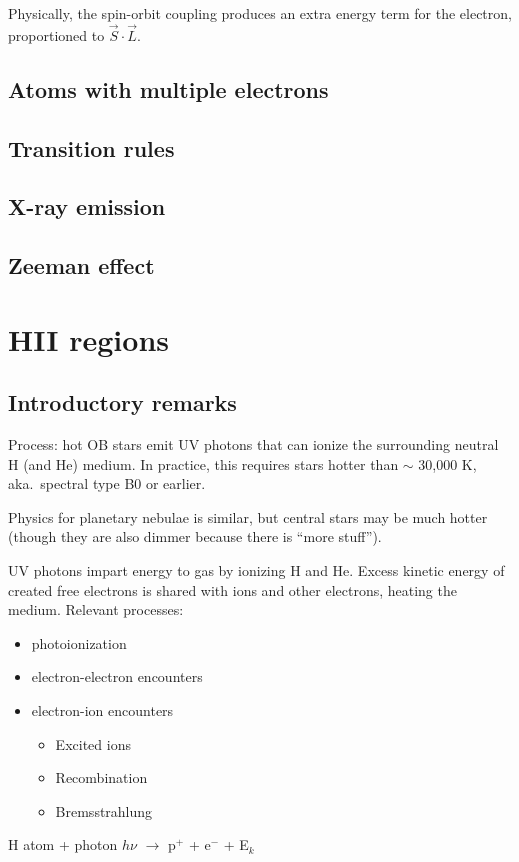 \documentclass[12pt]{article}
\newcommand{\mar}[1]{\hspace{0pt}\marginpar{-\textcolor{black}{#1}-}}
\begin{document}
Physically, the spin-orbit coupling produces an extra energy term for the
electron, proportioned to $\vec{S}\cdot\vec{L}$.

\mar{I10}
\subsection{Atoms with multiple electrons}

\mar{I11}
\mar{I12}
\mar{I13}
\mar{I14}
\mar{I15}
\mar{I16}
\mar{I17}
\mar{I18}
\mar{I19}
\subsection{Transition rules}

\mar{I20}
\subsection{X-ray emission}
\subsection{Zeeman effect}

\mar{I21}

\newpage
\mar{51}
\section{HII regions}
\subsection{Introductory remarks}
Process: hot OB stars emit UV photons that can ionize the surrounding neutral H
(and He) medium. In practice, this requires stars hotter than $\sim$ 30,000
K, aka.\ spectral type B0 or earlier.

Physics for planetary nebulae is similar, but central stars may be much
hotter (though they are also dimmer because there is ``more stuff'').

UV photons impart energy to gas by ionizing H and He. Excess kinetic energy
of created free electrons is shared with ions and other electrons, heating
the medium. Relevant processes:
\begin{itemize}
    \item photoionization
    \item electron-electron encounters
    \item electron-ion encounters
        \begin{itemize}
            \item Excited ions
            \item Recombination
            \item Bremsstrahlung
        \end{itemize}
\end{itemize}
H atom + photon $h\nu$ $\longrightarrow$ p$^{+}$ + e$^{-}$ + E$_{k}$
\end{document}
